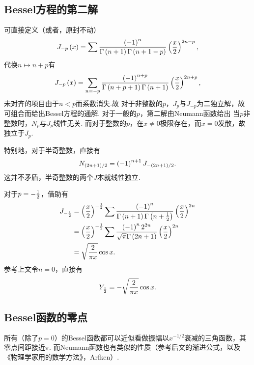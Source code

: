 \documentclass[UTF-8]{ctexart}
\begin{document}
  \subsection{Bessel方程的第二解}
  可直接定义（或者，原封不动）
  \[ J_{-p}\left(x\right) = \sum \frac{\left(-1\right)^n}{\Gamma\left(n+1\right)\Gamma\left(n+1-p\right)}\left(\frac{x}{2}\right)^{2n-p}, \]
  代换$n\mapsto n+p$有
  \[ J_{-p}\left(x\right) = \sum_{n=-p} \frac{\left(-1\right)^{n+p}}{\Gamma\left(n+p+1\right)\Gamma\left(n+1\right)}\left(\frac{x}{2}\right)^{2n+p}, \]
  未对齐的项目由于$n<p$而系数消失.故
  对于非整数的$p$，$J_p$与$J_{-p}$为二独立解，故可组合而给出Bessel方程的通解. 对于一般的$p$，第二解由Neumann函数给出
  当$p$非整数时，$N_p$与$J_p$线性无关. 而对于整数的$p$，在$x\ne 0$极限存在，而$x=0$发散，故独立于$J_p$.
  \par
  特别地，对于半奇整数，直接有
  \[ N_{\left(2n+1\right)/2}=\left(-1\right)^{n+1}J_{-\left(2n+1\right)/2}. \]
  这并不矛盾，半奇整数的两个$J$本就线性独立.
  \par
  \begin{ex}
    \label{ex:p-half}
    对于$p=-\frac{1}{2}$，借助有
    \begin{align*}
    J_{-\frac{1}{2}} &= \left(\frac{x}{2}\right)^{-\frac{1}{2}} \sum \frac{\left(-1\right)^n}{\Gamma\left(n+1\right)\Gamma\left(n+\frac{1}{2}\right)}\left(\frac{x}{2}\right)^{2n} \\
    &= \left(\frac{x}{2}\right)^{-\frac{1}{2}} \sum \frac{\left(-1\right)^n2^{2n}}{\sqrt{\pi}\Gamma\left(2n+1\right)}\left(\frac{x}{2}\right)^{2n} \\
    &= \sqrt{\frac{2}{\pi x}}\cos x.
    \end{align*}
    参考上文令$n=0$，直接有
    \[ Y_{\frac{1}{2}} = -\sqrt{\frac{2}{\pi x}}\cos x. \]
  \end{ex}
  \subsection{Bessel函数的零点}
  所有（除了$p=0$）的Bessel函数都可以近似看做振幅以$x^{-1/2}$衰减的三角函数，其零点间距接近$\pi$. 而Neumann函数也有类似的性质（参考后文的渐进公式，以及《物理学家用的数学方法》，Arfken）.
\end{document}
